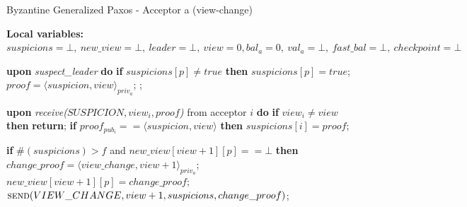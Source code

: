 \begin{algorithm} 
	\caption{Byzantine Generalized Paxos - Acceptor a (view-change)}
	\label{BFT-Proc}
	\textbf{Local variables:} $suspicions = \bot,\ new\_view = \bot,\ leader = \bot,\ view = 0, bal_a = 0,\ val_a = \bot,\ fast\_bal = \bot,\ checkpoint=\bot$
	\begin{algorithmic}[1]		
		\State \textbf{upon} \textit{suspect\_leader} \textbf{do} 
		\State\hspace{\algorithmicindent} \textbf{if} $suspicions[p] \neq true$ \textbf{then}
		\State\hspace{\algorithmicindent}\hspace{\algorithmicindent} $suspicions[p] = true$;
		\State\hspace{\algorithmicindent}\hspace{\algorithmicindent} $proof = \langle suspicion, view \rangle_{priv_a}$;
		\State \hspace{\algorithmicindent}\hspace{\algorithmicindent} ;	
		\State
		
		\State \textbf{upon} \textit{receive($SUSPICION, view_i, proof$)} from acceptor $i$ \textbf{do} 
		\State\hspace{\algorithmicindent} \textbf{if} $view_i \neq view$ \textbf{then}
		\State\hspace{\algorithmicindent}\hspace{\algorithmicindent} \textbf{return};
		\State\hspace{\algorithmicindent} \textbf{if} $proof_{pub_i} == \langle suspicion, view \rangle$ \textbf{then}
		\State\hspace{\algorithmicindent}\hspace{\algorithmicindent} $suspicions[i] = proof$;
		
		\State\hspace{\algorithmicindent} \textbf{if} $\#(suspicions) > f$ and $new\_view[view+1][p] == \bot$ \textbf{then}
		\State\hspace{\algorithmicindent}\hspace{\algorithmicindent} $change\_proof = \langle view\_change, view +1 \rangle_{priv_a}$;
		\State\hspace{\algorithmicindent}\hspace{\algorithmicindent} $new\_view[view+1][p] = change\_proof$;
		\State\hspace{\algorithmicindent}\hspace{\algorithmicindent} $\Call{send}{VIEW\_CHANGE, view+1, suspicions, change\_proof}$;
		\State
		

\end{algorithmic}
\end{algorithm}
